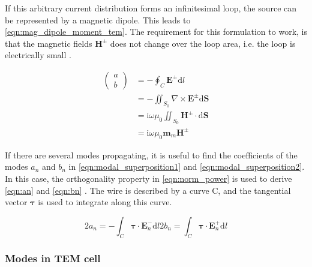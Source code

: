 If this arbitrary current distribution forms an infinitesimal loop, the source can be represented by a magnetic dipole. This leads to \autoref{eqn:mag_dipole_moment_tem}. The requirement for this formulation to work, is that the magnetic fields $\mathbf{H}^\pm$ does not change over the loop area, i.e. the loop is electrically small \cite{Collin_2015,Sreenivasiah_Chang_Ma_1981}.

\begin{align}
    \begin{pmatrix}a \\b\end{pmatrix} &= -\oint_C \mathbf{E}^\pm \mathrm{d}l \nonumber \\
    &= -\iint_{S_0} \nabla \times \mathbf{E}^\pm \mathrm{d}\mathbf{S}\nonumber\\
    &= \mathrm{i}\omega\mu_0\iint_{S_0} \mathbf{H}^\pm\cdot \mathrm{d}\mathbf{S}\nonumber\\
    &= \mathrm{i}\omega\mu_0\mathbf{m}_m\mathbf{H}^\pm 
    \label{eqn:mag_dipole_moment_tem}
\end{align}


If there are several modes propagating, it is useful to find the coefficients of the modes $a_n$ and $b_n$ in \autoref{eqn:modal_superposition1} and \autoref{eqn:modal_superposition2}. In this case, the orthogonality property in \autoref{eqn:norm_power} is used to derive \autoref{eqn:an} and \autoref{eqn:bn} \cite{Collin_2015}. The wire is described by a curve C, and the tangential vector $\boldsymbol{\tau}$ is used to integrate along this curve.

\begin{subequations}
    \begin{equation}
        2a_n = -\int_C \boldsymbol{\tau}\cdot\mathbf{E}_n^-\mathrm{d}l
        \label{eqn:an}
    \end{equation}
        \begin{equation}
        2b_n = \int_C \boldsymbol{\tau}\cdot\mathbf{E}_n^+\mathrm{d}l
        \label{eqn:bn}
    \end{equation}
\end{subequations}

\subsubsection{Modes in TEM cell}

